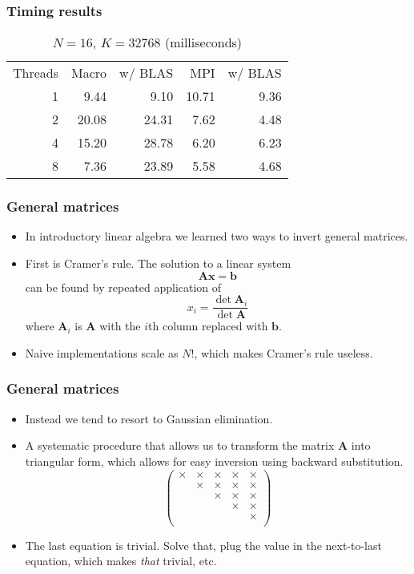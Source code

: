 \begin{frame}
  \frametitle{Timing results}
  \begin{center}
    \begin{table}
      \caption{$N=16$, $K=32768$ (milliseconds)}
      \bgroup{}
      \begin{tabular}{rrrrr}
        \hline
        Threads & Macro & w/ BLAS & MPI & w/ BLAS \\
        \hhline{=====}
        1 &  9.44 &  9.10 & 10.71 & 9.36 \\
        2 & 20.08 & 24.31 &  7.62 & 4.48 \\
        4 & 15.20 & 28.78 &  6.20 & 6.23 \\
        8 &  7.36 & 23.89 &  5.58 & 4.68 \\
        \hline
      \end{tabular}
      \egroup
    \end{table}
  \end{center}
\end{frame}

\begin{frame}
  \frametitle{General matrices}
  \begin{itemize}
  \item In introductory linear algebra we learned two ways to invert general
    matrices.
  \item First is Cramer's rule. The solution to  a linear system
    \[ \bm A \bm x = \bm b \]
    can be found by repeated application of
    \[ x_i = \frac{\det{\bm A_i}}{\det{\bm A}} \]
    where $\bm A_i$ is $\bm A$ with the $i$th column replaced with $\bm b$.
  \item Naive implementations scale as $N!$, which makes Cramer's rule useless.
  \end{itemize}
\end{frame}

\begin{frame}
  \frametitle{General matrices}
  \begin{itemize}
  \item Instead we tend to resort to Gaussian elimination.
  \item A systematic procedure that allows us to transform the matrix $\bm A$
    into triangular form, which allows for easy inversion using backward
    substitution.
    \[
      \begin{pmatrix}
        \times & \times & \times & \times & \times \\
        & \times & \times & \times & \times \\
        & & \times & \times & \times \\
        & & & \times & \times \\
        & & & & \times \\
      \end{pmatrix}
    \]
  \item The last equation is trivial. Solve that, plug the value in the
    next-to-last equation, which makes \emph{that} trivial, etc.
  \end{itemize}
\end{frame}

